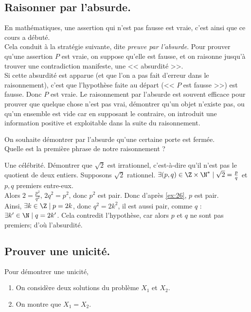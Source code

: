\documentclass[11pt]{article}
\begin{document}
\subsection{Raisonner par l'absurde.}

En mathématiques, une assertion qui n'est pas fausse est vraie, c'est ainsi que ce cours a débuté.\\
Cela conduit à la stratégie suivante, dite \emph{preuve par l'absurde}. Pour prouver qu'une assertion $P$ est vraie, on suppose qu'elle est fausse, et on raisonne jusqu'à trouver une contradiction manifeste, une << absurdité >>.\\
Si cette absurdité est apparue (et que l'on a pas fait d'erreur dans le raisonnement), c'est que l'hypothèse faite au départ (<< $P$ est fausse >>) est fausse. Donc $P$ est vraie.\n
Le raisonnement par l'absurde est souvent efficace pour prouver que quelque chose n'est pas vrai, démontrer qu'un objet n'existe pas, ou qu'un ensemble est vide car en supposant le contraire, on introduit une information positive et exploitable dans la suite du raisonnement.
\vspace*{0.3cm}

\begin{ex}{}{}
    On souhaite démontrer par l'absurde qu'une certaine porte est fermée.\\
    Quelle est la première phrase de notre raisonnement ?
\end{ex}

\begin{ex}{Une célébrité.}{}
    Démontrer que $\sqrt{2}$ est irrationnel, c'est-à-dire qu'il n'est pas le quotient de deux entiers.
    \tcblower
    Supposons $\sqrt{2}$ rationnel. $\exists (p,q)\in \Z\times\N^* \mid \sqrt{2}=\frac{p}{q}$ et $p,q$ premiers entre-eux.\\
    Alors $2=\frac{p^2}{q^2}$, $2q^2=p^2$, donc $p^2$ est pair. Donc d'après \ref{ex:26}, $p$ est pair.\\
    Ainsi, $\exists k\in\Z\mid p=2k$, donc $q^2=2k^2$, il est aussi pair, comme $q$ : $\exists k'\in\N\mid q=2k'$.\n
    Cela contredit l'hypothèse, car alors $p$ et $q$ ne sont pas premiers; d'où l'absurdité.
\end{ex}

\subsection{Prouver une unicité.}

\begin{meth}{}{}
    Pour démontrer une unicité,
    \begin{enumerate}
        \item On considère deux solutions du problème $X_1$ et $X_2$.
        \item On montre que $X_1=X_2$.
    \end{enumerate}
\end{meth}
\end{document}
